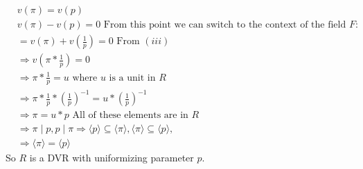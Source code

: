 \documentclass[11pt]{article}
\begin{document}
{\begin{align*}
     & v(\pi) = v(p)                                                                                                                                    \\
     & v(\pi) - v(p) = 0 \text{ From this point we can switch to the context of the field $F$}:                                                         \\
     & = v(\pi) + v(\frac{1}{p}) = 0 \text{ From $(iii)$}                                                                                               \\
     & \Rightarrow v(\pi * \frac{1}{p}) = 0                                                                                                             \\
     & \Rightarrow \pi * \frac{1}{p} = u \text{ where $u$ is a unit in $R$}                                                                             \\
     & \Rightarrow \pi * \frac{1}{p} * \left( \frac{1}{p} \right) ^{-1} = u * \left( \frac{1}{p} \right) ^{-1}                                          \\
     & \Rightarrow \pi = u*p \text{ All of these elements are in $R$}                                                                                   \\
     & \Rightarrow \pi \mid p, p \mid \pi \Rightarrow \langle p \rangle \subseteq \langle \pi \rangle, \langle \pi \rangle \subseteq \langle p \rangle, \\
     & \Rightarrow \langle \pi \rangle = \langle p \rangle
  \end{align*}
  So $R$ is a DVR with uniformizing parameter $p$.

}
\end{document}
